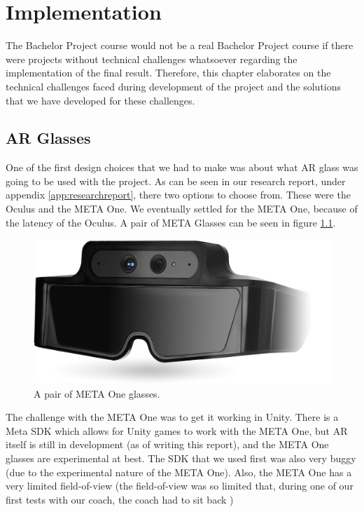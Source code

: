 \chapter{Implementation} \label{cha:implementation}
	The Bachelor Project course would not be a real Bachelor Project course if 
	there were projects without technical challenges whatsoever regarding the 
	implementation of the final result. Therefore, this chapter elaborates
	on the technical challenges faced during development of the project and
	the solutions that we have developed for these challenges.
	
	\section{AR Glasses} \label{sec:arglasses}
		One of the first design choices that we had to make was about what
		AR glass was going to be used with the project. As can be seen in
		our research report, under appendix \ref{app:researchreport},
		there two options to choose from. These were the Oculus and
		the META One. We eventually settled for the META One, because
		of the latency of the Oculus. A pair of META Glasses can be seen in
		figure \ref{fig:metaone}.
		
		\begin{figure}[!ht]
			\centering
			\includegraphics[width=\textwidth]{MetaOneGlasses}
			\caption{A pair of META One glasses.}
			\label{fig:metaone}
		\end{figure}
		
		The challenge with the META One was to get it working in Unity.
		There is a Meta SDK which allows for Unity games to work with
		the META One, but AR itself is still in development (as of
		writing this report), and the META One glasses are experimental
		at best. The SDK that we used first was also very buggy (due to the
		experimental nature of the META One). Also, the META One has a very
		limited field-of-view (the field-of-view was so limited that, during
		one of our first tests with our coach, the coach had to sit back
		)
		
